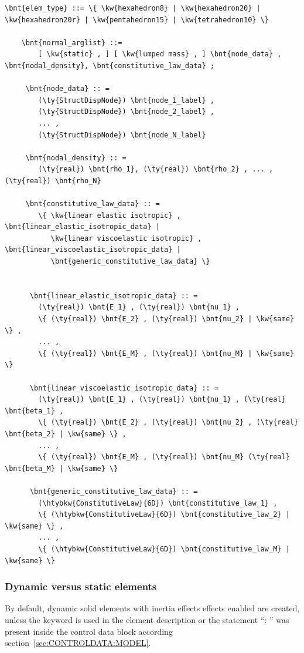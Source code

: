 \begin{Verbatim}[commandchars=\\\{\}]
    \bnt{elem_type} ::= \{ \kw{hexahedron8} | \kw{hexahedron20} | \kw{hexahedron20r} | \kw{pentahedron15} | \kw{tetrahedron10} \}

    \bnt{normal_arglist} ::=
        [ \kw{static} , ] [ \kw{lumped mass} , ] \bnt{node_data} , \bnt{nodal_density}, \bnt{constitutive_law_data} ;

     \bnt{node_data} :: =
        (\ty{StructDispNode}) \bnt{node_1_label} ,
        (\ty{StructDispNode}) \bnt{node_2_label} ,
        ... ,
        (\ty{StructDispNode}) \bnt{node_N_label}

     \bnt{nodal_density} :: =
        (\ty{real}) \bnt{rho_1}, (\ty{real}) \bnt{rho_2} , ... , (\ty{real}) \bnt{rho_N}

     \bnt{constitutive_law_data} :: =
        \{ \kw{linear elastic isotropic} , \bnt{linear_elastic_isotropic_data} |
           \kw{linear viscoelastic isotropic} , \bnt{linear_viscoelastic_isotropic_data} |
           \bnt{generic_constitutive_law_data} \}


      \bnt{linear_elastic_isotropic_data} :: =
        (\ty{real}) \bnt{E_1} , (\ty{real}) \bnt{nu_1} ,
        \{ (\ty{real}) \bnt{E_2} , (\ty{real}) \bnt{nu_2} | \kw{same} \} ,
        ... ,
        \{ (\ty{real}) \bnt{E_M} , (\ty{real}) \bnt{nu_M} | \kw{same} \}

      \bnt{linear_viscoelastic_isotropic_data} :: =
        (\ty{real}) \bnt{E_1} , (\ty{real}) \bnt{nu_1} , (\ty{real} \bnt{beta_1} ,
        \{ (\ty{real}) \bnt{E_2} , (\ty{real}) \bnt{nu_2} , (\ty{real} \bnt{beta_2} | \kw{same} \} ,
        ... ,
        \{ (\ty{real}) \bnt{E_M} , (\ty{real}) \bnt{nu_M} (\ty{real} \bnt{beta_M} | \kw{same} \}

      \bnt{generic_constitutive_law_data} :: =
        (\htybkw{ConstitutiveLaw}{6D}) \bnt{constitutive_law_1} ,
        \{ (\htybkw{ConstitutiveLaw}{6D}) \bnt{constitutive_law_2} | \kw{same} \} ,
        ... ,
        \{ (\htybkw{ConstitutiveLaw}{6D}) \bnt{constitutive_law_M} | \kw{same} \}
\end{Verbatim}

\subsubsection{Dynamic versus static elements}
By default, dynamic solid elements with inertia effects effects enabled are created,
unless the keyword  is used in the element description
or the statement ``: '' was present inside the control data block according section~\ref{sec:CONTROLDATA:MODEL}.

